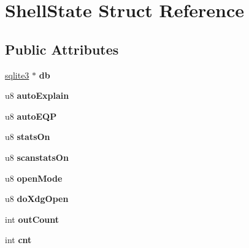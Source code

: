 \hypertarget{struct_shell_state}{}\section{Shell\+State Struct Reference}
\label{struct_shell_state}
\subsection*{Public Attributes}
\begin{DoxyCompactItemize}
\item 
\mbox{\label{struct_shell_state_aff5184c68cc62f6db1876cc28ffaf7e0}} 
\mbox{\hyperlink{structsqlite3}{sqlite3}} $\ast$ {\bfseries db}
\item 
\mbox{\label{struct_shell_state_a0f7472014f664d91e289615457a798d0}} 
u8 {\bfseries auto\+Explain}
\item 
\mbox{\label{struct_shell_state_aa549df1f9de4d8426d589e5cda754761}} 
u8 {\bfseries auto\+E\+QP}
\item 
\mbox{\label{struct_shell_state_a3b0b640aa0211b45e6a10a0304e25c05}} 
u8 {\bfseries stats\+On}
\item 
\mbox{\label{struct_shell_state_abba6e422a81b06fede02c7a189abc01d}} 
u8 {\bfseries scanstats\+On}
\item 
\mbox{\label{struct_shell_state_adf46ca050a9443b30487d796069282ac}} 
u8 {\bfseries open\+Mode}
\item 
\mbox{\label{struct_shell_state_abdde0bebe0fb2099bc03648eefe0c322}} 
u8 {\bfseries do\+Xdg\+Open}
\item 
\mbox{\label{struct_shell_state_aa3830a7924f73f6ff4eb27fd11ef4a14}} 
int {\bfseries out\+Count}
\item 
\mbox{\label{struct_shell_state_a2ff4d941ad9ef12844aa5281e98ef7c1}} 
int {\bfseries cnt}
\item 
\mbox{\label{struct_shell_state_afe68611d577c5398d24a790bac1b5e56}} 

\end{DoxyCompactItemize}
